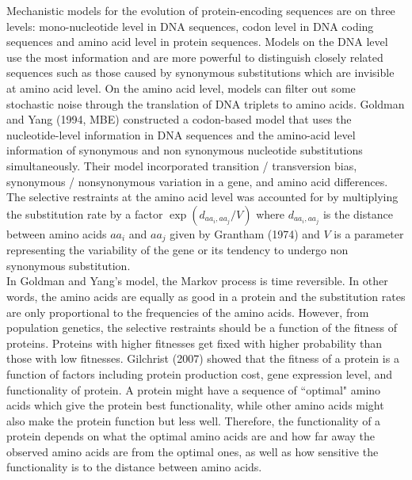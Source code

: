 \documentclass[13pt]{article}
\begin{document}
Mechanistic models for the evolution of protein-encoding sequences are on three levels: mono-nucleotide level in DNA sequences, codon level in DNA coding sequences and amino acid level in protein sequences. Models on the DNA level use the most information and are more powerful to distinguish closely related sequences such as those caused by synonymous substitutions which are invisible at amino acid level. On the amino acid level, models can filter out some stochastic noise through the translation of DNA triplets to amino acids. Goldman and Yang (1994, MBE) constructed a codon-based model that uses the nucleotide-level information in DNA sequences and the amino-acid level information of synonymous and non synonymous nucleotide substitutions simultaneously. Their model incorporated transition / transversion bias, synonymous / nonsynonymous variation in a gene, and amino acid differences. The selective restraints at the amino acid level was accounted for by multiplying the substitution rate by a factor $\exp (d_{aa_i,aa_j}/V)$ where $d_{aa_i, aa_j}$ is the distance between amino acids $aa_i$ and $aa_j$ given by Grantham (1974) and $V$ is a parameter representing the variability of the gene or its tendency to undergo non synonymous substitution.\\

In Goldman and Yang's model, the Markov process is time reversible. In other words, the amino acids are equally as good in a protein and the substitution rates are  only proportional to the frequencies of the amino acids. However, from population genetics, the selective restraints should be a function of the fitness of proteins. Proteins with higher fitnesses get fixed with higher probability than those with low fitnesses. Gilchrist (2007) showed that the fitness of a protein is a function of factors including protein production cost, gene expression level, and functionality of protein. A protein might have a sequence of ``optimal" amino acids which give the protein best functionality, while other amino acids might also make the protein function but less well. Therefore, the functionality of a protein depends on what the optimal amino acids are and how far away the observed amino acids are from the optimal ones, as well as how sensitive the functionality is to the distance between amino acids. \\
\end{document}
